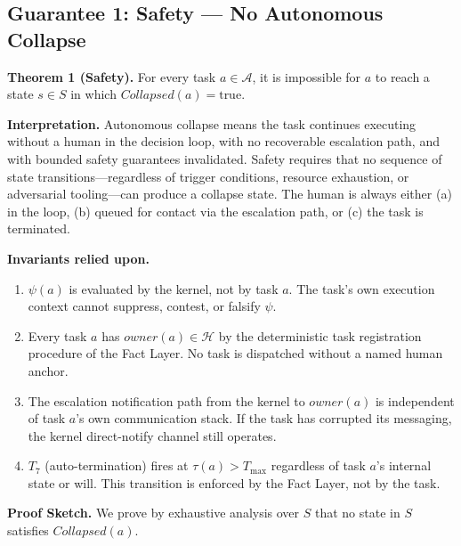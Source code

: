 \subsection{Guarantee 1: Safety — No Autonomous Collapse}
\label{sec:safety}

\textbf{Theorem 1 (Safety).} For every task $a \in \mathcal{A}$, it is impossible for $a$ to reach a state $s \in S$ in which $Collapsed(a) = \text{true}$.

\bigskip
\noindent\textbf{Interpretation.} Autonomous collapse means the task continues executing without a human in the decision loop, with no recoverable escalation path, and with bounded safety guarantees invalidated. Safety requires that no sequence of state transitions—regardless of trigger conditions, resource exhaustion, or adversarial tooling—can produce a collapse state. The human is always either (a) in the loop, (b) queued for contact via the escalation path, or (c) the task is terminated.

\bigskip
\noindent\textbf{Invariants relied upon.}

\begin{enumerate}
\item[\textbf{I1}] $\psi(a)$ is evaluated by the kernel, not by task $a$. The task's own execution context cannot suppress, contest, or falsify $\psi$.
\item[\textbf{I2}] Every task $a$ has $owner(a) \in \mathcal{H}$ by the deterministic task registration procedure of the Fact Layer. No task is dispatched without a named human anchor.
\item[\textbf{I3}] The escalation notification path from the kernel to $owner(a)$ is independent of task $a$'s own communication stack. If the task has corrupted its messaging, the kernel direct-notify channel still operates.
\item[\textbf{I4}] $T_7$ (auto-termination) fires at $\tau(a) > T_\text{max}$ regardless of task $a$'s internal state or will. This transition is enforced by the Fact Layer, not by the task.
\end{enumerate}

\bigskip
\noindent\textbf{Proof Sketch.} We prove by exhaustive analysis over $S$ that no state in $S$ satisfies $Collapsed(a)$.

